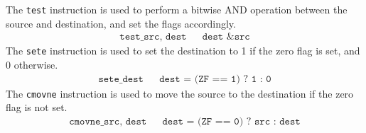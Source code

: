 \documentclass{article}
\begin{document}
  \begin{definition}
    The \texttt{test} instruction is used to perform a bitwise AND operation between the source and destination, and set the flags accordingly. 
    \begin{align*}
      \texttt{test\_ src, dest} && \texttt{dest \& src} 
    \end{align*}
    The \texttt{sete} instruction is used to set the destination to 1 if the zero flag is set, and 0 otherwise. 
    \begin{align*}
      \texttt{sete\_ dest} && \texttt{dest = (ZF == 1) ? 1 : 0} 
    \end{align*}
    The \texttt{cmovne} instruction is used to move the source to the destination if the zero flag is not set. 
    \begin{align*}
      \texttt{cmovne\_ src, dest} && \texttt{dest = (ZF == 0) ? src : dest} 
    \end{align*}
  \end{definition}
\end{document}
